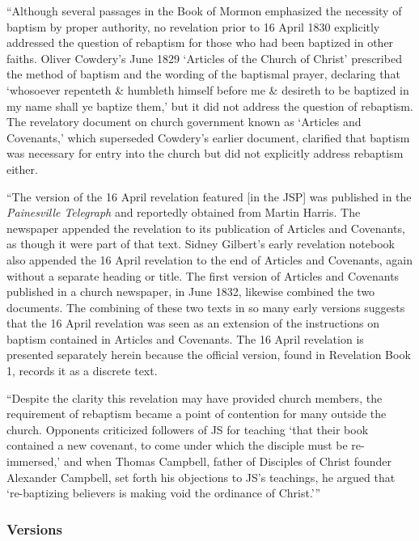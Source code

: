 			``Although several passages in the Book of Mormon emphasized the necessity of baptism by proper authority, no revelation prior to 16 April 1830 explicitly addressed the question of rebaptism for those who had been baptized in other faiths. Oliver Cowdery's June 1829 `Articles of the Church of Christ' prescribed the method of baptism and the wording of the baptismal prayer, declaring that `whosoever repenteth \& humbleth himself before me \& desireth to be baptized in my name shall ye baptize them,' but it did not address the question of rebaptism. The revelatory document on church government known as `Articles and Covenants,' which superseded Cowdery's earlier document, clarified that baptism was necessary for entry into the church but did not explicitly address rebaptism either.
			
			``The version of the 16 April revelation featured [in the JSP] was published in the \textit{Painesville Telegraph} and reportedly obtained from Martin Harris. The newspaper appended the revelation to its publication of Articles and Covenants, as though it were part of that text. Sidney Gilbert's early revelation notebook also appended the 16 April revelation to the end of Articles and Covenants, again without a separate heading or title. The first version of Articles and Covenants published in a church newspaper, in June 1832, likewise combined the two documents. The combining of these two texts in so many early versions suggests that the 16 April revelation was seen as an extension of the instructions on baptism contained in Articles and Covenants. The 16 April revelation is presented separately herein because the official version, found in Revelation Book 1, records it as a discrete text.
			
			``Despite the clarity this revelation may have provided church members, the requirement of rebaptism became a point of contention for many outside the church. Opponents criticized followers of JS for teaching `that their book contained a new covenant, to come under which the disciple must be re-immersed,' and when Thomas Campbell, father of Disciples of Christ founder Alexander Campbell, set forth his objections to JS's teachings, he argued that `re-baptizing believers is making void the ordinance of Christ.'''
			
	\subsubsection{Versions}
		\label{DC22-V}
		
